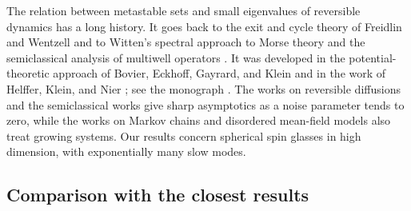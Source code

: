 The relation between metastable sets and small eigenvalues of reversible dynamics has a long history. It goes back to the exit and cycle theory of Freidlin and Wentzell \cite{FreidlinWentzell2012} and to Witten's spectral approach to Morse theory \cite{Witten1982} and the semiclassical analysis of multiwell operators \cite{HelfferSjostrand1984}. It was developed in the potential-theoretic approach of Bovier, Eckhoff, Gayrard, and Klein \cite{BovierEckhoffGayrardKlein2000,BovierEckhoffGayrardKlein2001,BovierEckhoffGayrardKlein2002,BovierEckhoffGayrardKlein2004,BovierGayrardKlein2005} and in the work of Helffer, Klein, and Nier \cite{HelfferKleinNier2004}; see the monograph \cite{BovierDenHollander2015}. The works on reversible diffusions and the semiclassical works give sharp asymptotics as a noise parameter tends to zero, while the works on Markov chains and disordered mean-field models also treat growing systems. Our results concern spherical spin glasses in high dimension, with exponentially many slow modes.

\subsection{Comparison with the closest results}\label{sec:intro-comparison}

